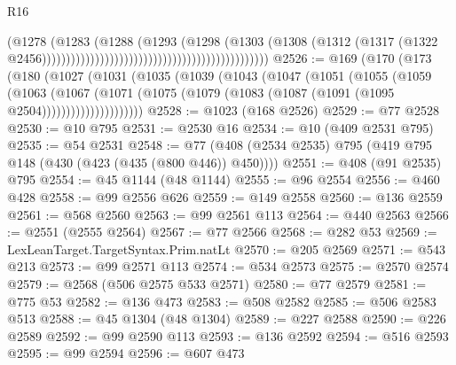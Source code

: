 \begin{lexlean}{R16}
\begin{coremodule}
                                                                              (@1278
                                                                                (@1283
                                                                                  (@1288
                                                                                    (@1293
                                                                                      (@1298
                                                                                        (@1303
                                                                                          (@1308
                                                                                            (@1312
                                                                                              (@1317
                                                                                                (@1322
                                                                                                  @2456)))))))))))))))))))))))))))))))))))))))))))))))
@2526 := @169
    (@170
      (@173
        (@180
          (@1027
            (@1031
              (@1035
                (@1039
                  (@1043
                    (@1047
                      (@1051
                        (@1055
                          (@1059
                            (@1063
                              (@1067
                                (@1071
                                  (@1075
                                    (@1079 (@1083 (@1087 (@1091 (@1095 @2504)))))))))))))))))))))
@2528 := @1023 (@168 @2526)
@2529 := @77 @2528
@2530 := @10 @795
@2531 := @2530 @16
@2534 := @10 (@409 @2531 @795)
@2535 := @54 @2531
@2548 := @77 (@408 (@2534 @2535) @795 (@419 @795 @148 (@430 (@423 (@435 (@800 @446)) @450))))
@2551 := @408 (@91 @2535) @795
@2554 := @45 @1144 (@48 @1144)
@2555 := @96 @2554
@2556 := @460 @428
@2558 := @99 @2556 @626
@2559 := @149 @2558
@2560 := @136 @2559
@2561 := @568 @2560
@2563 := @99 @2561 @113
@2564 := @440 @2563
@2566 := @2551 (@2555 @2564)
@2567 := @77 @2566
@2568 := @282 @53
@2569 := LexLeanTarget.TargetSyntax.Prim.natLt
@2570 := @205 @2569
@2571 := @543 @213
@2573 := @99 @2571 @113
@2574 := @534 @2573
@2575 := @2570 @2574
@2579 := @2568 (@506 @2575 @533 @2571)
@2580 := @77 @2579
@2581 := @775 @53
@2582 := @136 @473
@2583 := @508 @2582
@2585 := @506 @2583 @513
@2588 := @45 @1304 (@48 @1304)
@2589 := @227 @2588
@2590 := @226 @2589
@2592 := @99 @2590 @113
@2593 := @136 @2592
@2594 := @516 @2593
@2595 := @99 @2594
@2596 := @607 @473

\end{coremodule}
\end{lexlean}
